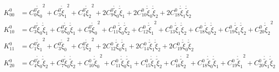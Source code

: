 \begin{equation}\begin{aligned}
K^0_{00} &= {C^{0}_{0}} {{\mathring{{\widetilde{{\xi}}}}}_{0}}^{2} + {C^{0}_{3}} {{\mathring{{\widetilde{{\xi}}}}}_{1}}^{2} + {C^{0}_{4}} {{\mathring{{\widetilde{{\xi}}}}}_{2}}^{2} + 2 {C^{0}_{9}} {{\mathring{{\widetilde{{\xi}}}}}_{0}} {{\mathring{{\widetilde{{\xi}}}}}_{1}} + 2 {C^{0}_{10}} {{\mathring{{\widetilde{{\xi}}}}}_{0}} {{\mathring{{\widetilde{{\xi}}}}}_{2}} + 2 {C^{0}_{18}} {{\mathring{{\widetilde{{\xi}}}}}_{1}} {{\mathring{{\widetilde{{\xi}}}}}_{2}}\\
K^0_{10} &= {C^{0}_{3}} {{\mathring{{\widetilde{{\xi}}}}}_{0}} {{\mathring{{\widetilde{{\xi}}}}}_{1}} + {C^{0}_{6}} {{\mathring{{\widetilde{{\xi}}}}}_{0}} {{\mathring{{\widetilde{{\xi}}}}}_{1}} + {C^{0}_{9}} {{\mathring{{\widetilde{{\xi}}}}}_{0}}^{2} + {C^{0}_{11}} {{\mathring{{\widetilde{{\xi}}}}}_{0}} {{\mathring{{\widetilde{{\xi}}}}}_{2}} + {C^{0}_{12}} {{\mathring{{\widetilde{{\xi}}}}}_{1}}^{2} + {C^{0}_{13}} {{\mathring{{\widetilde{{\xi}}}}}_{1}} {{\mathring{{\widetilde{{\xi}}}}}_{2}} + {C^{0}_{18}} {{\mathring{{\widetilde{{\xi}}}}}_{0}} {{\mathring{{\widetilde{{\xi}}}}}_{2}} + {C^{0}_{19}} {{\mathring{{\widetilde{{\xi}}}}}_{1}} {{\mathring{{\widetilde{{\xi}}}}}_{2}} + {C^{0}_{20}} {{\mathring{{\widetilde{{\xi}}}}}_{2}}^{2}\\
K^0_{11} &= {C^{0}_{1}} {{\mathring{{\widetilde{{\xi}}}}}_{1}}^{2} + {C^{0}_{3}} {{\mathring{{\widetilde{{\xi}}}}}_{0}}^{2} + {C^{0}_{5}} {{\mathring{{\widetilde{{\xi}}}}}_{2}}^{2} + 2 {C^{0}_{12}} {{\mathring{{\widetilde{{\xi}}}}}_{0}} {{\mathring{{\widetilde{{\xi}}}}}_{1}} + 2 {C^{0}_{14}} {{\mathring{{\widetilde{{\xi}}}}}_{1}} {{\mathring{{\widetilde{{\xi}}}}}_{2}} + 2 {C^{0}_{19}} {{\mathring{{\widetilde{{\xi}}}}}_{0}} {{\mathring{{\widetilde{{\xi}}}}}_{2}}\\
K^0_{20} &= {C^{0}_{4}} {{\mathring{{\widetilde{{\xi}}}}}_{0}} {{\mathring{{\widetilde{{\xi}}}}}_{2}} + {C^{0}_{7}} {{\mathring{{\widetilde{{\xi}}}}}_{0}} {{\mathring{{\widetilde{{\xi}}}}}_{2}} + {C^{0}_{10}} {{\mathring{{\widetilde{{\xi}}}}}_{0}}^{2} + {C^{0}_{11}} {{\mathring{{\widetilde{{\xi}}}}}_{0}} {{\mathring{{\widetilde{{\xi}}}}}_{1}} + {C^{0}_{15}} {{\mathring{{\widetilde{{\xi}}}}}_{1}} {{\mathring{{\widetilde{{\xi}}}}}_{2}} + {C^{0}_{16}} {{\mathring{{\widetilde{{\xi}}}}}_{2}}^{2} + {C^{0}_{18}} {{\mathring{{\widetilde{{\xi}}}}}_{0}} {{\mathring{{\widetilde{{\xi}}}}}_{1}} + {C^{0}_{19}} {{\mathring{{\widetilde{{\xi}}}}}_{1}}^{2} + {C^{0}_{20}} {{\mathring{{\widetilde{{\xi}}}}}_{1}} {{\mathring{{\widetilde{{\xi}}}}}_{2}}\\

\end{aligned}
\end{equation}
